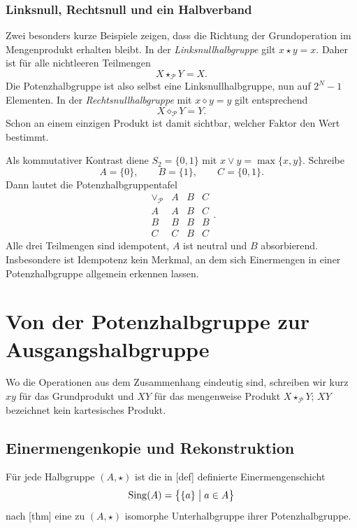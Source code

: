 \documentclass[main.tex]{subfiles}
\begin{document}
\subsection{Linksnull, Rechtsnull und ein Halbverband}

Zwei besonders kurze Beispiele zeigen, dass die Richtung der Grundoperation
im Mengenprodukt erhalten bleibt.  In der \emph{Linksnullhalbgruppe} gilt
\(x\star y=x\).  Daher ist für alle nichtleeren Teilmengen
\[
  X\star_{\mathcal P}Y=X.
\]
Die Potenzhalbgruppe ist also selbst eine Linksnullhalbgruppe, nun auf
\(2^N-1\) Elementen.  In der \emph{Rechtsnullhalbgruppe} mit
\(x\diamond y=y\) gilt entsprechend
\[
  X\diamond_{\mathcal P}Y=Y.
\]
Schon an einem einzigen Produkt ist damit sichtbar, welcher Faktor den Wert
bestimmt.

Als kommutativer Kontrast diene \(S_2=\{0,1\}\) mit
\(x\vee y=\max\{x,y\}\).  Schreibe
\[
  A=\{0\},\qquad B=\{1\},\qquad C=\{0,1\}.
\]
Dann lautet die Potenzhalbgruppentafel
\[
\begin{array}{c|ccc}
\vee_{\mathcal P}&A&B&C\\\hline
A&A&B&C\\
B&B&B&B\\
C&C&B&C
\end{array}.
\]
Alle drei Teilmengen sind idempotent, \(A\) ist neutral und \(B\)
absorbierend.  Insbesondere ist Idempotenz kein Merkmal, an dem sich
Einermengen in einer Potenzhalbgruppe allgemein erkennen lassen.


\chapter{Von der Potenzhalbgruppe zur Ausgangshalbgruppe}

Wo die Operationen aus dem Zusammenhang eindeutig sind, schreiben wir kurz
\(xy\) für das Grundprodukt und \(XY\) für das mengenweise Produkt
\(X\star_{\mathcal P}Y\); \(XY\) bezeichnet kein kartesisches Produkt.

\section{Einermengenkopie und Rekonstruktion}

Für jede Halbgruppe \((A,\star)\) ist die in
[def] definierte
Einermengenschicht
\[
  \operatorname{Sing}(A)=\bigl\{\{a\}\bigm|a\in A\bigr\}
\]
nach [thm] eine zu
\((A,\star)\) isomorphe Unterhalbgruppe ihrer Potenzhalbgruppe.
\end{document}
